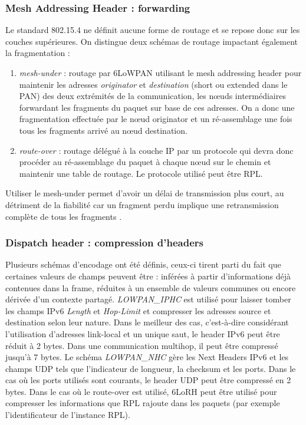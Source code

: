\documentclass[]{report}
\begin{document}
\subsubsection{Mesh Addressing Header : forwarding}

\par Le standard 802.15.4 ne définit aucune forme de routage et se repose donc sur les couches supérieures. On distingue deux schémas de routage impactant également la fragmentation :
\begin{enumerate}
\item \textit{mesh-under} : routage par 6LoWPAN utilisant le mesh addressing header pour maintenir les adresses \textit{originator} et \textit{destination} (short ou extended dans le PAN) des deux extrémités de la communication, les nœuds intermédiaires forwardant les fragments du paquet sur base de ces adresses. On a donc une fragmentation effectuée par le nœud originator et un ré-assemblage une fois tous les fragments arrivé au nœud destination.
\vspace{0.1cm}
\item \textit{route-over} : routage délégué à la couche IP par un protocole qui devra donc procéder au ré-assemblage du paquet à chaque nœud sur le chemin et maintenir une table de routage. Le protocole utilisé peut être RPL.
\end{enumerate}

\vspace{0.1cm}

Utiliser le mesh-under permet d'avoir un délai de transmission plus court, au détriment de la fiabilité car un fragment perdu implique une retransmission complète de tous les fragments \cite{wiki:6LoWPAN}.

\subsubsection{Dispatch header : compression d'headers}

\par Plusieurs schémas d'encodage ont été définis, ceux-ci tirent parti du fait que certaines valeurs de champs peuvent être : inférées à partir d'informations déjà contenues dans la frame, réduites à un ensemble de valeurs communes ou encore dérivée d'un contexte partagé. \textit{LOWPAN\_IPHC} est utilisé pour laisser tomber les champs IPv6 \textit{Length} et \textit{Hop-Limit} et compresser les adresses source et destination selon leur nature. Dans le meilleur des cas, c'est-à-dire considérant l'utilisation d'adresses link-local et un unique saut, le header IPv6 peut être réduit à 2 bytes. Dans une communication multihop, il peut être compressé jusqu'à 7 bytes. Le schéma \textit{LOWPAN\_NHC} gère les Next Headers IPv6 et les champs UDP tels que l'indicateur de longueur, la checksum et les ports. Dans le cas où les ports utilisés sont courants, le header UDP peut être compressé en 2 bytes. Dans le cas où le route-over est utilisé, 6LoRH \cite{rfc8138} peut être utilisé pour compresser les informations que RPL rajoute dans les paquets (par exemple l'identificateur de l'instance RPL). 
\end{document}
